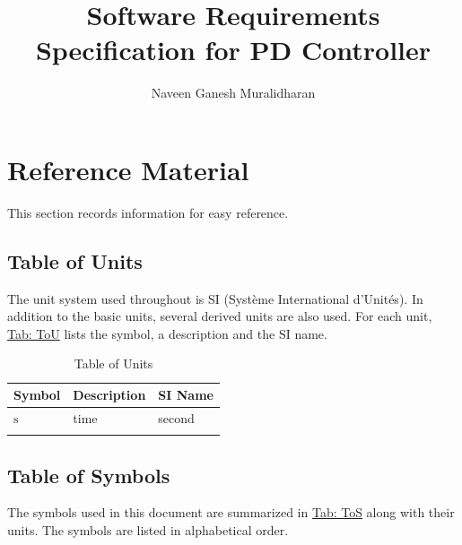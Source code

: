 \documentclass[12pt]{article}
\title{Software Requirements Specification for PD Controller}
\author{Naveen Ganesh Muralidharan}
\begin{document}
\maketitle
\tableofcontents
\newpage
\section{Reference Material}
\label{Sec:RefMat}
This section records information for easy reference.

\subsection{Table of Units}
\label{Sec:ToU}
The unit system used throughout is SI (Système International d'Unités). In addition to the basic units, several derived units are also used. For each unit, \hyperref[Table:ToU]{Tab: ToU} lists the symbol, a description and the SI name.

\begin{longtable}{l l l}
\toprule
\textbf{Symbol} & \textbf{Description} & \textbf{SI Name}
\\
\midrule
\endhead
${\text{s}}$ & time & second
\\
\bottomrule
\caption{Table of Units}
\label{Table:ToU}
\end{longtable}
\subsection{Table of Symbols}
\label{Sec:ToS}
The symbols used in this document are summarized in \hyperref[Table:ToS]{Tab: ToS} along with their units. The symbols are listed in alphabetical order.
\end{document}
